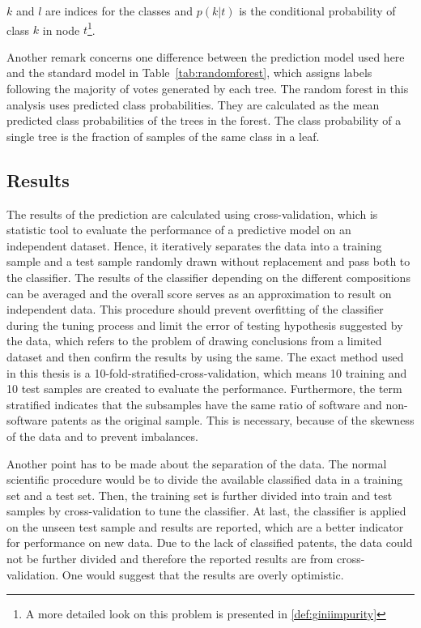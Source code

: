 \documentclass[12pt, a4paper, abstract, parskip]{scrartcl}
\theoremstyle{definition}
\begin{document}
$k$ and $l$ are indices for the classes and $p(k|t)$ is the conditional
probability of class $k$ in node $t$\footnote{A more detailed look on this
problem is presented in \ref{def:giniimpurity}}.

Another remark concerns one difference between the prediction model used here
and the standard model in Table~\ref{tab:randomforest}, which assigns labels
following the majority of votes generated by each tree. The random forest in
this analysis uses predicted class probabilities. They are calculated as the
mean predicted class probabilities of the trees in the forest. The class
probability of a single tree is the fraction of samples of the same class in a
leaf.


\subsection{Results} %
\label{sub:results}

The results of the prediction are calculated using cross-validation, which is
statistic tool to evaluate the performance of a predictive model on an
independent dataset. Hence, it iteratively separates the data into a training
sample and a test sample randomly drawn without replacement and pass both to
the classifier. The results of the classifier depending on the different
compositions can be averaged and the overall score serves as an approximation
to result on independent data. This procedure should prevent overfitting of the
classifier during the tuning process and limit the error of testing hypothesis
suggested by the data, which refers to the problem of drawing conclusions from
a limited dataset and then confirm the results by using the same. The exact
method used in this thesis is a 10-fold-stratified-cross-validation, which
means 10 training and 10 test samples are created to evaluate the performance.
Furthermore, the term stratified indicates that the subsamples have the same
ratio of software and non-software patents as the original sample. This is
necessary, because of the skewness of the data and to prevent imbalances.

Another point has to be made about the separation of the data. The normal
scientific procedure would be to divide the available classified data in a
training set and a test set. Then, the training set is further divided into
train and test samples by cross-validation to tune the classifier. At last, the
classifier is applied on the unseen test sample and results are reported, which
are a better indicator for performance on new data. Due to the lack of
classified patents, the data could not be further divided and therefore the
reported results are from cross-validation. One would suggest that the results
are overly optimistic.
\end{document}
